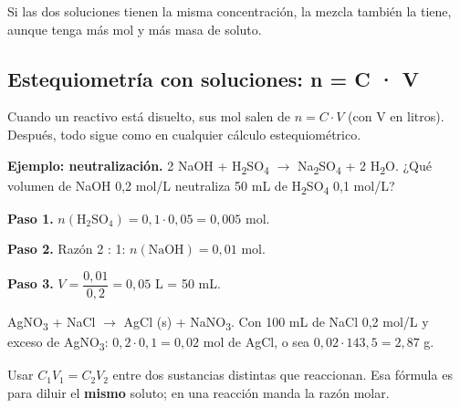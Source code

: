 \begin{ojo} Si las dos soluciones tienen la misma concentración, la mezcla también la tiene, aunque tenga más mol y más masa de soluto.\end{ojo}
\subsection{Estequiometría con soluciones: n = C · V}
Cuando un reactivo está disuelto, sus mol salen de $n = C\cdot V$ (con V en litros). Después, todo sigue como en cualquier cálculo estequiométrico.

 

\textbf{Ejemplo: neutralización.} 2 NaOH + H\textsubscript{2}SO\textsubscript{4} \ensuremath{\rightarrow} Na\textsubscript{2}SO\textsubscript{4} + 2 H\textsubscript{2}O. ¿Qué volumen de NaOH 0,2 mol/L neutraliza 50 mL de H\textsubscript{2}SO\textsubscript{4} 0,1 mol/L?

 

\textbf{Paso 1.} $n(\text{H}_2\text{SO}_4) = 0{,}1\cdot 0{,}05 = 0{,}005$ mol.

 

\textbf{Paso 2.} Razón 2 : 1: $n(\text{NaOH}) = 0{,}01$ mol.

 

\textbf{Paso 3.} $V = \dfrac{0{,}01}{0{,}2} = 0{,}05$ L = 50 mL.

  
\begin{ejemplo} AgNO\textsubscript{3} + NaCl \ensuremath{\rightarrow} AgCl (s) + NaNO\textsubscript{3}. Con 100 mL de NaCl 0,2 mol/L y exceso de AgNO\textsubscript{3}: $0{,}2\cdot 0{,}1 = 0{,}02$ mol de AgCl, o sea $0{,}02\cdot 143{,}5 = 2{,}87$ g.\end{ejemplo}
 
\begin{ojo} Usar $C_1 V_1 = C_2 V_2$ entre dos sustancias distintas que reaccionan. Esa fórmula es para diluir el \textbf{mismo} soluto; en una reacción manda la razón molar.\end{ojo}
